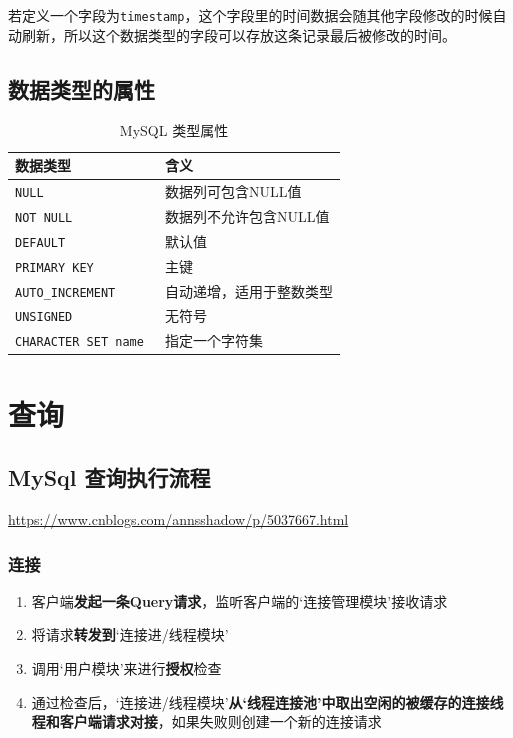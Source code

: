 \documentclass[UTF8,a4paper,12pt]{ctexbook}
\begin{document}
		若定义一个字段为\verb|timestamp|，这个字段里的时间数据会随其他字段修改的时候自动刷新，所以这个数据类型的字段可以存放这条记录最后被修改的时间。
		
	\section{数据类型的属性}
		\begin{table}[H]
			\centering
			\caption{MySQL 类型属性}
			\begin{tabular}{p{5cm}<{\centering}|p{11cm}<{\centering}}
				\toprule
					数据类型  &  含义\\
				\midrule
					\verb|NULL | &  数据列可包含NULL值 \\
					\verb|NOT NULL | &  数据列不允许包含NULL值 \\
					\verb|DEFAULT | & 默认值 \\
					\verb|PRIMARY KEY | & 主键 \\
					\verb|AUTO_INCREMENT | & 自动递增，适用于整数类型 \\
					\verb|UNSIGNED | & 无符号 \\
					\verb|CHARACTER SET name | & 指定一个字符集 \\
				\bottomrule
			\end{tabular}
		\end{table}			
				
			
\chapter{查询}
	\section{MySql 查询执行流程}
		\url{https://www.cnblogs.com/annsshadow/p/5037667.html}
			
		\subsection{连接}
			\begin{enumerate}
				\item 客户端\textbf{发起一条Query请求}，监听客户端的‘连接管理模块’接收请求
				\item 将请求\textbf{转发到}‘连接进/线程模块’
				\item 调用‘用户模块’来进行\textbf{授权}检查
				\item 通过检查后，‘连接进/线程模块’\textbf{从‘线程连接池’中取出空闲的被缓存的连接线程和客户端请求对接}，如果失败则创建一个新的连接请求
			\end{enumerate}
		
\end{document}
